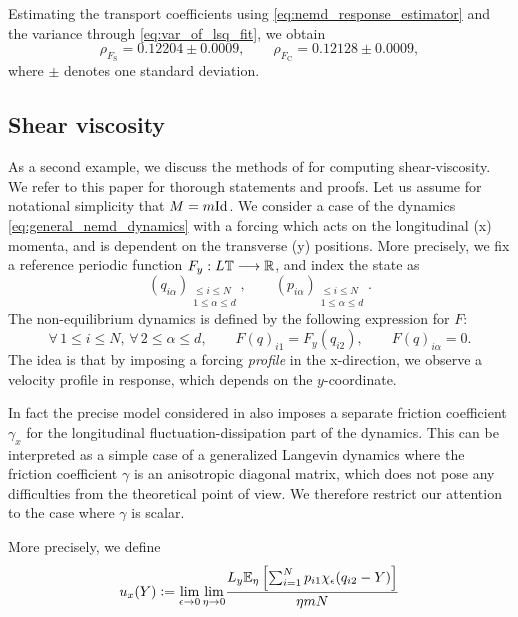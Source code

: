 Estimating the transport coefficients using \eqref{eq:nemd_response_estimator} and the variance through \eqref{eq:var_of_lsq_fit}, we obtain 
\begin{equation}
    \rho_{F_{\mathrm{S}}}=0.12204\pm0.0009,\qquad \rho_{F_{\mathrm{C}}}=0.12128\pm0.0009,
\end{equation}
where $\pm$ denotes one standard deviation.
\subsection{Shear viscosity}
As a second example, we discuss the methods of \cite{JS12} for computing shear-viscosity. We refer to this paper for thorough statements and proofs.
Let us assume for notational simplicity that $M=m\mathrm{Id}$.
We consider a case of the dynamics \eqref{eq:general_nemd_dynamics} with a forcing which acts on the longitudinal (x) momenta, and is dependent on the transverse (y) positions.
More precisely, we fix a reference periodic function $F_y:L\mathbb{T}\longrightarrow \mathbb{R}$,
and index the state as \[\left(q_{i\alpha}\right)_{\substack{\leq i\leq N\\1\leq \alpha\leq d}},\qquad \left(p_{i\alpha}\right)_{\substack{\leq i\leq N\\1\leq \alpha\leq d}}.\]
The non-equilibrium dynamics is defined by the following expression for $F$:
\begin{equation}
    \label{eq:shear_viscosity_forcing}
    \forall\, 1\leq i\leq N,\,\forall\, 2\leq \alpha\leq d,\qquad F(q)_{i1}=F_y(q_{i2}),\qquad F(q)_{i\alpha}=0.
\end{equation}
The idea is that by imposing a forcing \textit{profile} in the x-direction, we observe a velocity profile in response, which depends on the $y$-coordinate.
\begin{remark}
    In fact the precise model considered in \cite{JS12} also imposes a separate friction coefficient $\gamma_x$ for the longitudinal fluctuation-dissipation part of the dynamics.
    This can be interpreted as a simple case of a generalized Langevin dynamics where the friction coefficient $\gamma$ is an anisotropic diagonal matrix, which does not pose any difficulties from the theoretical point of view.
    We therefore restrict our attention to the case where $\gamma$ is scalar.
\end{remark}
More precisely, we define
\begin{equation}
    \label{eq:velocity_profile}
    u_x(Y)\mathrel{\mathop:}= \underset{\epsilon \to 0}{\lim} \, \underset{\eta \to 0}{\lim} \frac{L_y\mathbb{E}_\eta \left[\sum_{i=1}^N p_{i1}\chi_\epsilon(q_{i2}-Y)\right]}{\eta mN}
\end{equation}
